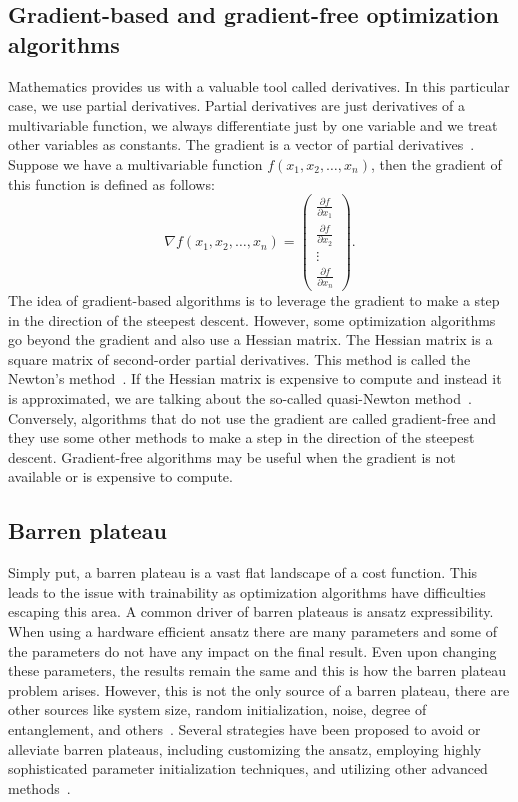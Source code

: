 \subsection{Gradient-based and gradient-free optimization algorithms}
Mathematics provides us with a valuable tool called derivatives. In this particular case, we use partial derivatives. Partial derivatives are just derivatives of a multivariable function, we always differentiate just by one variable and we treat other variables as constants. The gradient is a vector of partial derivatives~\cite{mmp}. Suppose we have a multivariable function $f(x_1, x_2, \ldots, x_n)$, then the gradient of this function is defined as follows:
\begin{equation}
    \nabla f(x_1, x_2, \ldots, x_n) =  \begin{pmatrix} \frac{\partial f}{\partial x_1} \\ \frac{\partial f}{\partial x_2} \\ \vdots \\ \frac{\partial f}{\partial x_n}\end{pmatrix} \text{.}
\end{equation}
The idea of gradient-based algorithms is to leverage the gradient to make a step in the direction of the steepest descent. However, some optimization algorithms go beyond the gradient and also use a Hessian matrix. The Hessian matrix is a square matrix of second-order partial derivatives. This method is called the Newton's method~\cite{newton}. If the Hessian matrix is expensive to compute and instead it is approximated, we are talking about the so-called quasi-Newton method~\cite{quasi-newton}. Conversely, algorithms that do not use the gradient are called gradient-free and they use some other methods to make a step in the direction of the steepest descent. Gradient-free algorithms may be useful when the gradient is not available or is expensive to compute.

\subsection{Barren plateau}
Simply put, a barren plateau is a vast flat landscape of a cost function. This leads to the issue with trainability as optimization algorithms have difficulties escaping this area. A common driver of barren plateaus is ansatz expressibility. When using a hardware efficient ansatz there are many parameters and some of the parameters do not have any impact on the final result. Even upon changing these parameters, the results remain the same and this is how the barren plateau problem arises. However, this is not the only source of a barren plateau, there are other sources like system size, random initialization, noise, degree of entanglement, and others~\cite{vqe_method}.
Several strategies have been proposed to avoid or alleviate barren plateaus, including customizing the ansatz, employing highly sophisticated parameter initialization techniques, and utilizing other advanced methods~\cite{vqe_method}.